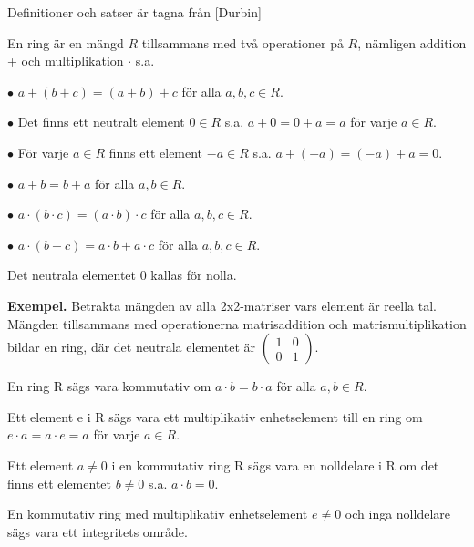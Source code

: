Definitioner och satser är tagna från [Durbin]

\begin{definition}
En ring är en mängd $R$ tillsammans med två operationer på $R$, nämligen addition + och multiplikation $\cdot$ s.a.

$\bullet$ $a+(b+c) = (a+b)+c$ för alla $a,b,c \in R$.

$\bullet$ Det finns ett neutralt element $0 \in R$ s.a. $a+0=0+a=a$ för varje $a \in R$.

$\bullet$ För varje $a \in R$ finns ett element $-a \in R$ s.a. $a + (-a) = (-a) + a = 0$.

$\bullet$ $a + b = b + a$ för alla $a,b \in R$.

$\bullet$ $a \cdot (b \cdot c)=(a \cdot b) \cdot c$ för alla $a,b,c \in R$.

$\bullet$ $a \cdot (b + c) = a \cdot b + a \cdot c$ för alla $a,b,c \in R$.

\noindent
Det neutrala elementet $0$ kallas för nolla.

\end{definition}

\noindent\textbf{Exempel.} Betrakta mängden av alla 2x2-matriser vars element är reella tal. Mängden tillsammans 
med operationerna matrisaddition och matrismultiplikation bildar en ring, där det neutrala elementet är $
\begin{pmatrix}
 1 & 0 \\
 0 & 1
\end{pmatrix}.
$

\begin{definition}
 En ring R sägs vara kommutativ om $a \cdot b = b \cdot a$ för alla $a,b \in R$.
\end{definition}

\begin{definition}
 Ett element e i R sägs vara ett multiplikativ enhetselement till en ring om $e \cdot a = a \cdot e = a$ för varje $a \in R$.
\end{definition}

\begin{definition}
 Ett element $a \neq 0$ i en kommutativ ring R sägs vara en nolldelare i R om det finns ett elementet
$b \neq 0$ s.a. $a \cdot b = 0$.
\end{definition}

\begin{definition}
 En kommutativ ring med multiplikativ enhetselement $e \neq 0$ och inga nolldelare sägs vara ett integritets område.
\end{definition}

